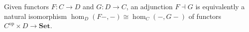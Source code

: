 Given functors $F: C \rightarrow D$ and $G: D \rightarrow C$, an adjunction $F \dashv G$ is equivalently a natural isomorphism $\hom_D(F-, -) \cong \hom_C(-, G-)$ of functors $C^{\text{op}} \times D \rightarrow \mathbf{Set}$.